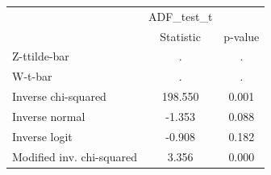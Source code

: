 \begin{tabular}{l*{2}{c}}
\hline\hline
            &  ADF\_test\_t&            \\
            &   Statistic&     p-value\\
\hline
Z-ttilde-bar&           .&           .\\
W-t-bar     &           .&           .\\
Inverse chi-squared&     198.550&       0.001\\
Inverse normal&      -1.353&       0.088\\
Inverse logit&      -0.908&       0.182\\
Modified inv. chi-squared&       3.356&       0.000\\
\hline\hline
\end{tabular}
